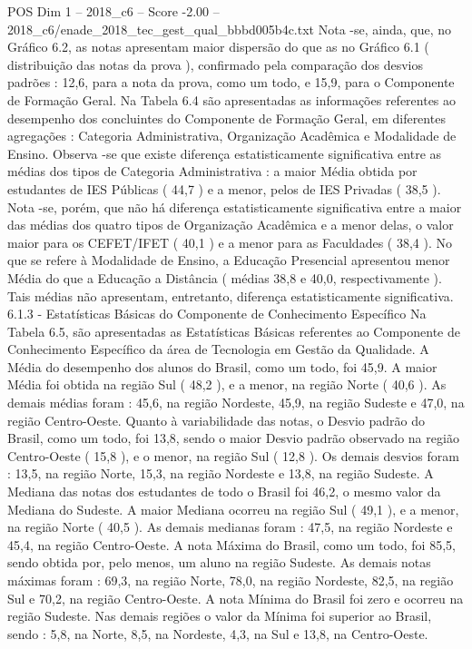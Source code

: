 \begin{textsample}{POS Dim 1 – 2018\_c6 – Score -2.00 – 2018\_c6/enade\_2018\_tec\_gest\_qual\_bbbd005b4c.txt}
Nota -se, ainda, que, no Gráfico 6.2, as notas apresentam maior dispersão do que as no Gráfico 6.1 ( distribuição das notas da prova ), confirmado pela comparação dos desvios padrões : 12,6, para a nota da prova, como um todo, e 15,9, para o Componente de Formação Geral.
Na Tabela 6.4 são apresentadas as informações referentes ao desempenho dos concluintes do Componente de Formação Geral, em diferentes agregações : Categoria Administrativa, Organização Acadêmica e Modalidade de Ensino.
Observa -se que existe diferença estatisticamente significativa entre as médias dos tipos de Categoria Administrativa : a maior Média obtida por estudantes de IES Públicas ( 44,7 ) e a menor, pelos de IES Privadas ( 38,5 ).
Nota -se, porém, que não há diferença estatisticamente significativa entre a maior das médias dos quatro tipos de Organização Acadêmica e a menor delas, o valor maior para os CEFET/IFET ( 40,1 ) e a menor para as Faculdades ( 38,4 ).
No que se refere à Modalidade de Ensino, a Educação Presencial apresentou menor Média do que a Educação a Distância ( médias 38,8 e 40,0, respectivamente ).
Tais médias não apresentam, entretanto, diferença estatisticamente significativa. 6.1.3 - Estatísticas Básicas do Componente de Conhecimento Específico Na Tabela 6.5, são apresentadas as Estatísticas Básicas referentes ao Componente de Conhecimento Específico da área de Tecnologia em Gestão da Qualidade.
A Média do desempenho dos alunos do Brasil, como um todo, foi 45,9.
A maior Média foi obtida na região Sul ( 48,2 ), e a menor, na região Norte ( 40,6 ).
As demais médias foram : 45,6, na região Nordeste, 45,9, na região Sudeste e 47,0, na região Centro-Oeste.
Quanto à variabilidade das notas, o Desvio padrão do Brasil, como um todo, foi 13,8, sendo o maior Desvio padrão observado na região Centro-Oeste ( 15,8 ), e o menor, na região Sul ( 12,8 ).
Os demais desvios foram : 13,5, na região Norte, 15,3, na região Nordeste e 13,8, na região Sudeste.
A Mediana das notas dos estudantes de todo o Brasil foi 46,2, o mesmo valor da Mediana do Sudeste.
A maior Mediana ocorreu na região Sul ( 49,1 ), e a menor, na região Norte ( 40,5 ).
As demais medianas foram : 47,5, na região Nordeste e 45,4, na região Centro-Oeste.
A nota Máxima do Brasil, como um todo, foi 85,5, sendo obtida por, pelo menos, um aluno na região Sudeste.
As demais notas máximas foram : 69,3, na região Norte, 78,0, na região Nordeste, 82,5, na região Sul e 70,2, na região Centro-Oeste.
A nota Mínima do Brasil foi zero e ocorreu na região Sudeste.
Nas demais regiões o valor da Mínima foi superior ao Brasil, sendo : 5,8, na Norte, 8,5, na Nordeste, 4,3, na Sul e 13,8, na Centro-Oeste.

\end{textsample}
